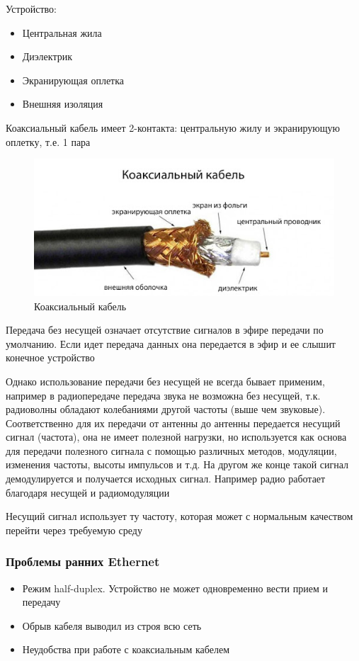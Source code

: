 \documentclass[a4paper]{article}
\begin{document}
Устройство:
\begin{itemize}
	\item Центральная жила
	\item Диэлектрик
	\item Экранирующая оплетка
	\item Внешняя изоляция
\end{itemize}

Коаксиальный кабель имеет 2-контакта: центральную жилу и экранирующую оплетку, т.е. 1 пара

\begin{figure}[!h]
	\centering
	\includegraphics[width=15cm]{14-coaxial-cabel}
	\caption{Коаксиальный кабель}
	\label{fig:pic-14-coaxial-cabel}
\end{figure}

Передача без несущей означает отсутствие сигналов в эфире передачи по умолчанию. Если идет передача данных она передается в эфир и ее слышит конечное устройство

Однако использование передачи без несущей не всегда бывает применим, например в радиопередаче передача звука не возможна без несущей, т.к. радиоволны обладают колебаниями другой частоты (выше чем звуковые). Соответственно для их передачи от антенны до антенны передается несущий сигнал (частота), она не имеет полезной нагрузки, но используется как основа для передачи полезного сигнала с помощью различных методов, модуляции, изменения частоты, высоты импульсов и т.д. На другом же конце такой сигнал демодулируется и получается исходных сигнал. Например радио работает благодаря несущей и радиомодуляции

Несущий сигнал использует ту частоту, которая может с нормальным качеством перейти через требуемую среду

\subsubsection{Проблемы ранних Ethernet}
\begin{itemize}
	\item Режим half-duplex. Устройство не может одновременно вести прием и передачу
	\item Обрыв кабеля выводил из строя всю сеть
	\item Неудобства при работе с коаксиальным кабелем 
\end{itemize}
\end{document}
